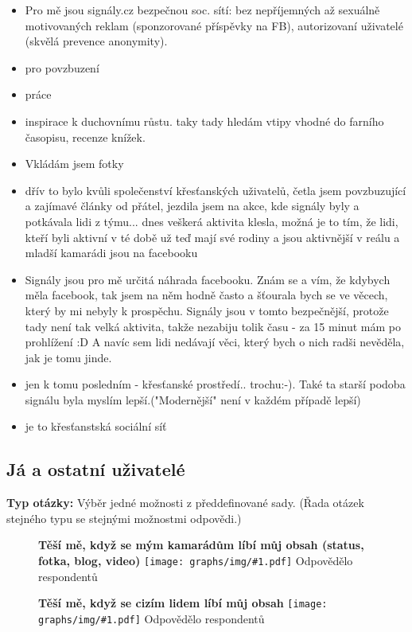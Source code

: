 \documentclass[12pt, a4paper, twoside]{article}
\newcommand{\answercount}[1]{Odpovědělo  respondentů}
\newcommand{\includegraph}[2]{
  \begin{figure}[H]
    \centering
    \textbf{#2}
    \texttt{[image: graphs/img/\#1.pdf]}
    \answercount{#1}
  \end{figure}
}
\newcommand{\qtype}{\textbf{Typ otázky:}
}
\newcommand{\pickOne}{Výběr jedné možnosti z předdefinované sady\xspace}
\newcommand{\series}{(Řada otázek stejného typu se stejnými možnostmi odpovědi.)\xspace}
\begin{document}
\begin{itemize}
\item Pro mě jsou signály.cz bezpečnou soc. sítí: bez nepříjemných až sexuálně motivovaných reklam (sponzorované příspěvky na FB), autorizovaní uživatelé (skvělá prevence anonymity).

\item pro povzbuzení

\item práce

\item inspirace k duchovnímu růstu. taky tady hledám vtipy vhodné do farního časopisu, recenze knížek.

\item Vkládám jsem fotky

\item dřív to bylo kvůli společenství křesťanských uživatelů, četla jsem povzbuzující a zajímavé články od přátel, jezdila jsem na akce, kde signály byly a potkávala lidi z týmu... dnes veškerá aktivita klesla, možná je to tím, že lidi, kteří byli aktivní v té době už teď mají své rodiny a jsou aktivnější v reálu a mladší kamarádi jsou na facebooku

\item Signály jsou pro mě určitá náhrada facebooku. Znám se a vím, že kdybych měla facebook, tak jsem na něm hodně často a šťourala bych se ve věcech, který by mi nebyly k prospěchu. Signály jsou v tomto bezpečnější, protože tady není tak velká aktivita, takže nezabiju tolik času - za 15 minut mám po prohlížení :D A navíc sem lidi nedávají věci, který bych o nich radši nevěděla, jak je tomu jinde.

\item jen k tomu posledním - křesťanské prostředí..  trochu:-). Také ta starší podoba signálu byla myslím lepší.("Modernější" není v každém případě lepší)

\item je to křesťanstská sociální síť
\end{itemize}

\subsection{Já a ostatní uživatelé}\label{sec:ostatniuzivatele}

\qtype \pickOne. \series

\includegraph{ostatni_tesi_me_libi_se_kamaradi}{Těší mě, když se mým kamarádům líbí můj obsah (status, fotka, blog, video)}

\includegraph{ostatni_tesi_me_libi_se_cizi}{Těší mě, když se cizím lidem líbí můj obsah}
\end{document}
